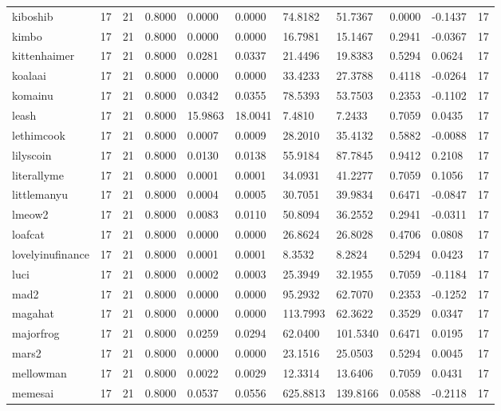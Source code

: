 \begin{table}[htbp]
\begin{tabular}{lllllllllll}
kiboshib & 17 & 21 & 0.8000 & 0.0000 & 0.0000 & 74.8182 & 51.7367 & 0.0000 & -0.1437 & 17 \\
kimbo & 17 & 21 & 0.8000 & 0.0000 & 0.0000 & 16.7981 & 15.1467 & 0.2941 & -0.0367 & 17 \\
kittenhaimer & 17 & 21 & 0.8000 & 0.0281 & 0.0337 & 21.4496 & 19.8383 & 0.5294 & 0.0624 & 17 \\
koalaai & 17 & 21 & 0.8000 & 0.0000 & 0.0000 & 33.4233 & 27.3788 & 0.4118 & -0.0264 & 17 \\
komainu & 17 & 21 & 0.8000 & 0.0342 & 0.0355 & 78.5393 & 53.7503 & 0.2353 & -0.1102 & 17 \\
leash & 17 & 21 & 0.8000 & 15.9863 & 18.0041 & 7.4810 & 7.2433 & 0.7059 & 0.0435 & 17 \\
lethimcook & 17 & 21 & 0.8000 & 0.0007 & 0.0009 & 28.2010 & 35.4132 & 0.5882 & -0.0088 & 17 \\
lilyscoin & 17 & 21 & 0.8000 & 0.0130 & 0.0138 & 55.9184 & 87.7845 & 0.9412 & 0.2108 & 17 \\
literallyme & 17 & 21 & 0.8000 & 0.0001 & 0.0001 & 34.0931 & 41.2277 & 0.7059 & 0.1056 & 17 \\
littlemanyu & 17 & 21 & 0.8000 & 0.0004 & 0.0005 & 30.7051 & 39.9834 & 0.6471 & -0.0847 & 17 \\
lmeow2 & 17 & 21 & 0.8000 & 0.0083 & 0.0110 & 50.8094 & 36.2552 & 0.2941 & -0.0311 & 17 \\
loafcat & 17 & 21 & 0.8000 & 0.0000 & 0.0000 & 26.8624 & 26.8028 & 0.4706 & 0.0808 & 17 \\
lovelyinufinance & 17 & 21 & 0.8000 & 0.0001 & 0.0001 & 8.3532 & 8.2824 & 0.5294 & 0.0423 & 17 \\
luci & 17 & 21 & 0.8000 & 0.0002 & 0.0003 & 25.3949 & 32.1955 & 0.7059 & -0.1184 & 17 \\
mad2 & 17 & 21 & 0.8000 & 0.0000 & 0.0000 & 95.2932 & 62.7070 & 0.2353 & -0.1252 & 17 \\
magahat & 17 & 21 & 0.8000 & 0.0000 & 0.0000 & 113.7993 & 62.3622 & 0.3529 & 0.0347 & 17 \\
majorfrog & 17 & 21 & 0.8000 & 0.0259 & 0.0294 & 62.0400 & 101.5340 & 0.6471 & 0.0195 & 17 \\
mars2 & 17 & 21 & 0.8000 & 0.0000 & 0.0000 & 23.1516 & 25.0503 & 0.5294 & 0.0045 & 17 \\
mellowman & 17 & 21 & 0.8000 & 0.0022 & 0.0029 & 12.3314 & 13.6406 & 0.7059 & 0.0431 & 17 \\
memesai & 17 & 21 & 0.8000 & 0.0537 & 0.0556 & 625.8813 & 139.8166 & 0.0588 & -0.2118 & 17 \\

\end{tabular}
\end{table}
